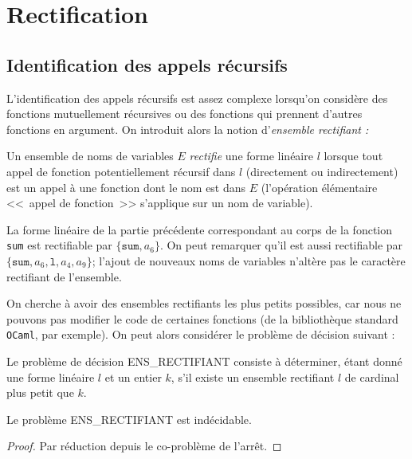 \section{Rectification}
\subsection{Identification des appels récursifs}

L'identification des appels récursifs est assez complexe lorsqu'on considère des
fonctions mutuellement récursives ou des fonctions qui prennent d'autres
fonctions en argument. On introduit alors la notion
d'\textit{ensemble rectifiant :}

\begin{definition}
    Un ensemble de noms de variables $E$ \textit{rectifie} une forme linéaire
    $l$ lorsque tout appel de fonction potentiellement récursif dans $l$
    (directement ou indirectement) est un appel à une fonction dont le nom est
    dans $E$ (l'opération élémentaire <<~appel de fonction~>> s'applique sur un
    nom de variable).
\end{definition}

\begin{example} \strut
    La forme linéaire de la partie précédente correspondant au corps de la
    fonction \texttt{sum} est rectifiable par $\{\texttt{sum}, a_6\}$. On peut
    remarquer qu'il est aussi rectifiable par
    $\{\texttt{sum}, a_6, \texttt{l}, a_4, a_9\}$; l'ajout de nouveaux noms de
    variables n'altère pas le caractère rectifiant de l'ensemble.
\end{example}

On cherche à avoir des ensembles rectifiants les plus petits possibles, car
nous ne pouvons pas modifier le code de certaines fonctions (de la bibliothèque
standard \texttt{OCaml}, par exemple). On peut alors considérer le problème de
décision suivant :

\begin{definition}
    Le problème de décision ENS\_RECTIFIANT consiste à déterminer, étant donné
    une forme linéaire $l$ et un entier $k$, s'il existe un ensemble rectifiant
    $l$ de cardinal plus petit que $k$.
\end{definition}

\begin{proposition}
    Le problème ENS\_RECTIFIANT est indécidable.
\end{proposition}

\begin{proof}
    Par réduction depuis le co-problème de l'arrêt.
\end{proof}

